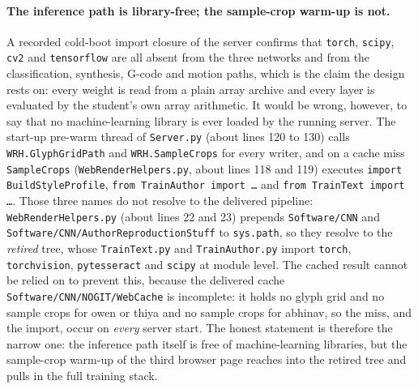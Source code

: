 \paragraph{The inference path is library-free; the sample-crop warm-up is not.}
A recorded cold-boot import closure of the server confirms that \texttt{torch}, \texttt{scipy}, \texttt{cv2} and \texttt{tensorflow} are all absent from the three networks and from the classification, synthesis, G-code and motion paths, which is the claim the design rests on: every weight is read from a plain array archive and every layer is evaluated by the student's own array arithmetic.
It would be wrong, however, to say that no machine-learning library is ever loaded by the running server.
The start-up pre-warm thread of \texttt{Server.py} (about lines 120 to 130) calls \texttt{WRH.GlyphGridPath} and \texttt{WRH.SampleCrops} for every writer, and on a cache miss \texttt{SampleCrops} (\texttt{WebRenderHelpers.py}, about lines 118 and 119) executes \texttt{import BuildStyleProfile}, \texttt{from TrainAuthor import \ldots} and \texttt{from TrainText import \ldots}.
Those three names do not resolve to the delivered pipeline: \texttt{WebRenderHelpers.py} (about lines 22 and 23) prepends \texttt{Software/CNN} and \texttt{Software/CNN/AuthorReproductionStuff} to \texttt{sys.path}, so they resolve to the \emph{retired} tree, whose \texttt{TrainText.py} and \texttt{TrainAuthor.py} import \texttt{torch}, \texttt{torchvision}, \texttt{pytesseract} and \texttt{scipy} at module level.
The cached result cannot be relied on to prevent this, because the delivered cache \texttt{Software/CNN/NOGIT/WebCache} is incomplete: it holds no glyph grid and no sample crops for owen or thiya and no sample crops for abhinav, so the miss, and the import, occur on \emph{every} server start.
The honest statement is therefore the narrow one: the inference path itself is free of machine-learning libraries, but the sample-crop warm-up of the third browser page reaches into the retired tree and pulls in the full training stack.

